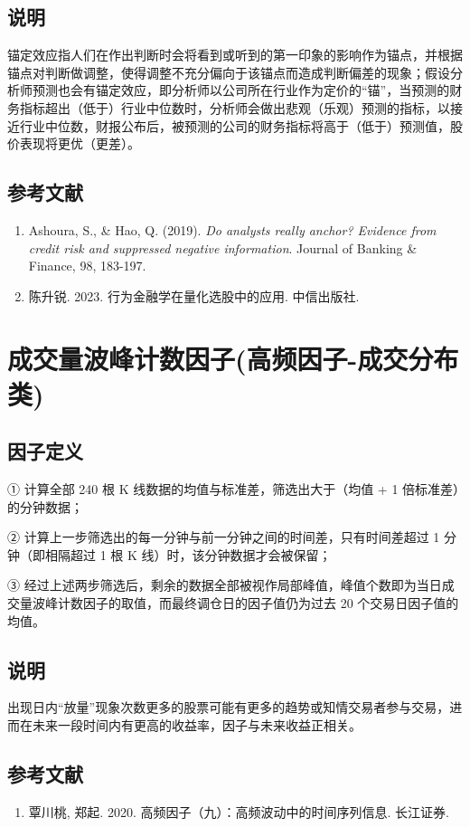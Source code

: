 \documentclass{article}
\begin{document}
\subsection{说明}
锚定效应指人们在作出判断时会将看到或听到的第一印象的影响作为锚点，并根据锚点对判断做调整，使得调整不充分偏向于该锚点而造成判断偏差的现象；假设分析师预测也会有锚定效应，即分析师以公司所在行业作为定价的“锚”，当预测的财务指标超出（低于）行业中位数时，分析师会做出悲观（乐观）预测的指标，以接近行业中位数，财报公布后，被预测的公司的财务指标将高于（低于）预测值，股价表现将更优（更差）。

\subsection{参考文献}
\begin{enumerate}
    \item Ashoura, S., \& Hao, Q. (2019). \textit{Do analysts really anchor? Evidence from credit risk and suppressed negative information}. Journal of Banking \& Finance, 98, 183-197.
    \item 陈升锐. 2023. 行为金融学在量化选股中的应用. 中信出版社.
\end{enumerate}

\section{成交量波峰计数因子(高频因子-成交分布类)}

\subsection{因子定义}

① 计算全部 240 根 K 线数据的均值与标准差，筛选出大于（均值 + 1 倍标准差）的分钟数据；

② 计算上一步筛选出的每一分钟与前一分钟之间的时间差，只有时间差超过 1 分钟（即相隔超过 1 根 K 线）时，该分钟数据才会被保留；

③ 经过上述两步筛选后，剩余的数据全部被视作局部峰值，峰值个数即为当日成交量波峰计数因子的取值，而最终调仓日的因子值仍为过去 20 个交易日因子值的均值。

\subsection{说明}
出现日内“放量”现象次数更多的股票可能有更多的趋势或知情交易者参与交易，进而在未来一段时间内有更高的收益率，因子与未来收益正相关。

\subsection{参考文献}
\begin{enumerate}
    \item 覃川桃, 郑起. 2020. 高频因子（九）：高频波动中的时间序列信息. 长江证券.
\end{enumerate}
\end{document}
